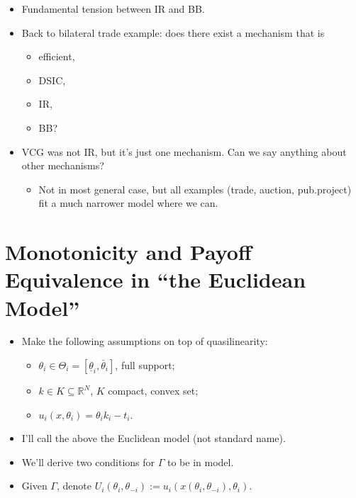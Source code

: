 \documentclass[english]{beamer}		%
\def\lyxframeend{} %
\begin{document}
\begin{itemize}
	\item Fundamental tension between IR and BB.
	\item Back to bilateral trade example: does there exist a mechanism that is
	\begin{itemize}
		\item efficient,
		\item DSIC,
		\item IR,
		\item BB?
	\end{itemize}
	\pause
	\item VCG was not IR, but it's just one mechanism. Can we say anything about other mechanisms?
	\begin{itemize}
		\item Not in most general case, but all examples (trade, auction, pub.project) fit a much narrower model where we can.
	\end{itemize}
\end{itemize}
\lyxframeend





\section{Monotonicity and Payoff Equivalence in ``the Euclidean Model''}

\begin{itemize}
	\item Make the following assumptions on top of quasilinearity:
	\begin{itemize}
		\item $\theta_i \in \Theta_{i} = [\underline{\theta}_i, \bar{\theta}_i]$, full support;
		\item $k \in K \subseteq \mathbb{R}^N$, $K$ compact, convex set;
		\item $u_i(x,\theta_i) = \theta_i k_i - t_i$.
	\end{itemize}
	\item I'll call the above \alert{the Euclidean model} (not standard name).
	\item We'll derive two  conditions for $\Gamma$ to be  in  model.
	\item Given $\Gamma$, denote $U_i(\theta_i, \theta_{-i}) := u_i\left(x(\theta_i, \theta_{-i}), \theta_i \right)$.
\end{itemize}
\lyxframeend
\end{document}
